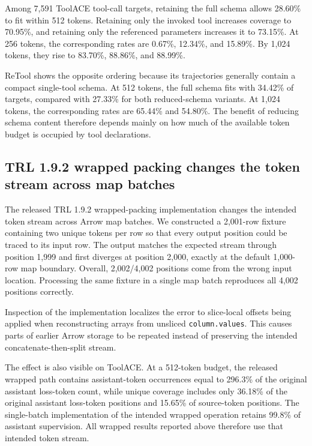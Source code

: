 \documentclass[pdflatex,sn-basic,Numbered]{sn-jnl}
\begin{document}
Among 7,591 ToolACE tool-call targets, retaining the full schema allows 28.60\% to fit within
512 tokens. Retaining only the invoked tool increases coverage to 70.95\%, and retaining only
the referenced parameters increases it to 73.15\%. At 256 tokens, the corresponding rates are
0.67\%, 12.34\%, and 15.89\%. By 1,024 tokens, they rise to 83.70\%, 88.86\%, and 88.99\%.

ReTool shows the opposite ordering because its trajectories generally contain a compact
single-tool schema. At 512 tokens, the full schema fits with 34.42\% of targets, compared with
27.33\% for both reduced-schema variants. At 1,024 tokens, the corresponding rates are 65.44\%
and 54.80\%. The benefit of reducing schema content therefore depends mainly on how much of the
available token budget is occupied by tool declarations.


\subsection{TRL 1.9.2 wrapped packing changes the token stream across map batches}
\label{sec:wrapped_defect}

The released TRL 1.9.2 wrapped-packing implementation changes the intended token stream across
Arrow map batches. We constructed a 2,001-row fixture containing two unique tokens per row so
that every output position could be traced to its input row. The output matches the expected
stream through position 1,999 and first diverges at position 2,000, exactly at the default
1,000-row map boundary. Overall, 2,002/4,002 positions come from the wrong input location.
Processing the same fixture in a single map batch reproduces all 4,002 positions correctly.

Inspection of the implementation localizes the error to slice-local offsets being applied when
reconstructing arrays from unsliced \texttt{column.values}. This causes parts of earlier Arrow
storage to be repeated instead of preserving the intended concatenate-then-split stream.

The effect is also visible on ToolACE. At a 512-token budget, the released wrapped path contains
assistant-token occurrences equal to 296.3\% of the original assistant loss-token count, while unique coverage includes only 36.18\% of the original assistant loss-token positions
and 15.65\% of source-token positions. The single-batch implementation
of the intended wrapped operation retains 99.8\% of assistant supervision. All wrapped results
reported above therefore use that intended token stream.
\end{document}
